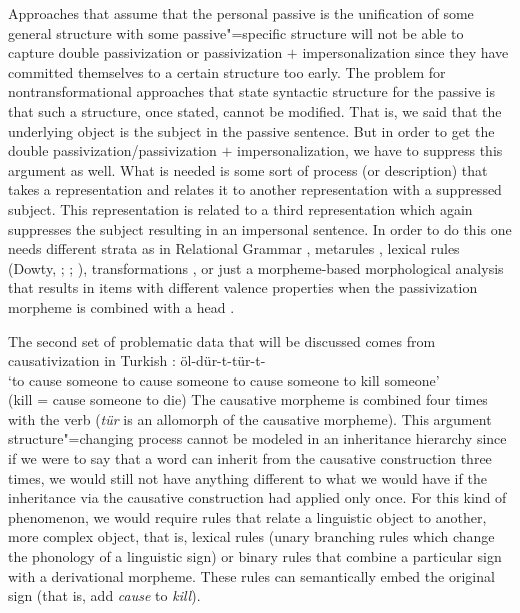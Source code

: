 Approaches that assume that the personal passive is the unification of some general structure with
some passive"=specific structure will not be able to capture double passivization or passivization $+$
impersonalization since they have committed themselves to a certain structure too early. The problem for
nontransformational approaches that state syntactic structure for the passive is that such a
structure, once stated, cannot be modified. That is, we said that the underlying object is the
subject in the passive sentence. But in order to get the double passivization/passivization $+$
impersonalization, we have to suppress this argument as well. What is needed is some sort of process
(or description) that takes a representation and relates it to another representation with a
suppressed subject. This representation is related to a third representation which again suppresses
the subject resulting in an impersonal sentence. In order to do this one needs different strata as
in Relational Grammar \citep{Timberlake82a,Ozkaragoez86a}, metarules \citep*{GKPS85a}, lexical
rules (Dowty, \citeyear[]{Dowty78a}; \citeyear[Section~3.4]{Dowty2003a};
\citealt{Bresnan82a,ps,Blevins2003a,Mueller2003e}), transformations \citep{Chomsky57a}, or just a
morpheme-based morphological analysis that results in items with different valence properties when
the passivization morpheme is combined with a head \citep{Chomsky81a}.

The second set of problematic data that will be discussed comes from causativization in Turkish
\citep[]{Lewis67a-u}:
\ea
öl-dür-t-tür-t- \\
`to cause someone to cause someone to cause someone to kill someone'\\
(kill = cause someone to die)
\z
The causative morpheme  is combined four times with the verb (\emph{tür} is an allomorph of the causative morpheme).
This argument structure"=changing process cannot be modeled in an inheritance hierarchy since if we were to say that a word can
inherit from the causative construction three times, we would still not
have anything different to what we would have if the inheritance via the causative construction had
applied only once. For this kind of phenomenon, we would require rules that relate a linguistic
object to another, more complex object, that is, lexical rules (unary branching rules which change the
phonology of a linguistic sign) or binary rules that combine a particular sign with a derivational
morpheme. These rules can semantically embed the original sign (that is, add
\emph{cause} to \emph{kill}).  

